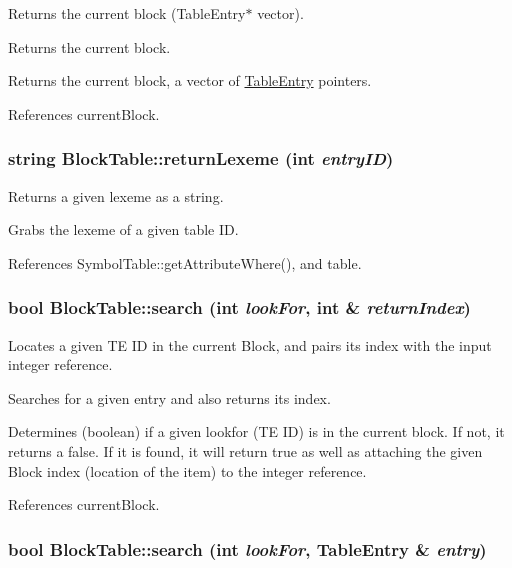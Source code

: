 Returns the current block (TableEntry$\ast$ vector). 

Returns the current block.

Returns the current block, a vector of \hyperlink{structTableEntry}{TableEntry} pointers. 

References currentBlock.

\hypertarget{classBlockTable_ac9c14b3836cb319a290db4bb6e952a49}{
\subsubsection[{returnLexeme}]{\setlength{\rightskip}{0pt plus 5cm}string BlockTable::returnLexeme (int {\em entryID})}}
\label{classBlockTable_ac9c14b3836cb319a290db4bb6e952a49}


Returns a given lexeme as a string. 

Grabs the lexeme of a given table ID.

References SymbolTable::getAttributeWhere(), and table.

\hypertarget{classBlockTable_a72860f8f2ba53404cdf4fdbaf9d5f85e}{
\subsubsection[{search}]{\setlength{\rightskip}{0pt plus 5cm}bool BlockTable::search (int {\em lookFor}, \/  int \& {\em returnIndex})}}
\label{classBlockTable_a72860f8f2ba53404cdf4fdbaf9d5f85e}


Locates a given TE ID in the current Block, and pairs its index with the input integer reference. 

Searches for a given entry and also returns its index.

Determines (boolean) if a given lookfor (TE ID) is in the current block. If not, it returns a false. If it is found, it will return true as well as attaching the given Block index (location of the item) to the integer reference. 

References currentBlock.

\hypertarget{classBlockTable_aab6bf14513041f3d29a15f9ebd7a053e}{
\subsubsection[{search}]{\setlength{\rightskip}{0pt plus 5cm}bool BlockTable::search (int {\em lookFor}, \/  {\bf TableEntry} \& {\em entry})}}
\label{classBlockTable_aab6bf14513041f3d29a15f9ebd7a053e}


